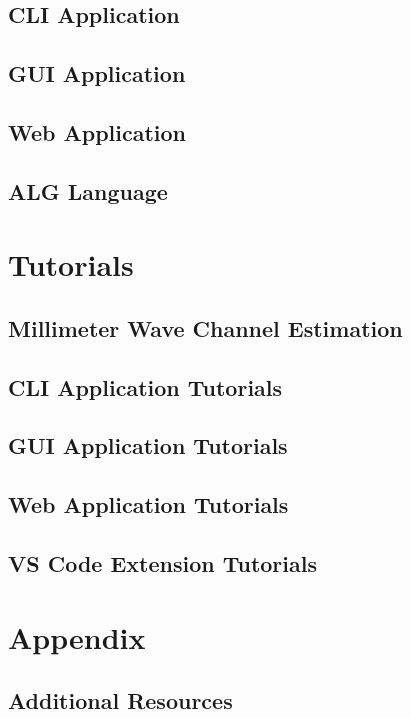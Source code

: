 \documentclass[use boldface]{beaulivre}
\begin{document}
\chapter{CLI Application}


\chapter{GUI Application}


\chapter{Web Application}


\chapter{ALG Language}


\part{Tutorials}

\chapter{Millimeter Wave Channel Estimation}


\chapter{CLI Application Tutorials}
\chapter{GUI Application Tutorials}
\chapter{Web Application Tutorials}
\chapter{VS Code Extension Tutorials}

\appendix

\cleardoublepage
\cleardoublepage
{}
{}
\part*{Appendix}
\chapter{Additional Resources}


\cleardoublepage
{}
{}
\printbibliography

\printindex
\end{document}
